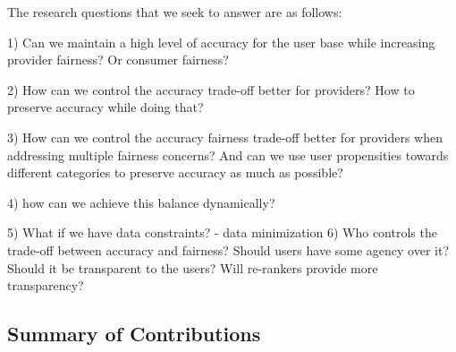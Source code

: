 The research questions that we seek to answer are as follows:

1) Can we maintain a high level of accuracy for the user base while increasing provider fairness? Or consumer fairness?

2) How can we control the accuracy trade-off better for providers? How to preserve accuracy while doing that? 

3) How can we control the accuracy fairness trade-off better for providers when addressing multiple fairness concerns? And can we use user propensities towards different categories to preserve accuracy as much as possible?

4) how can we achieve this balance dynamically?

5) What if we have data constraints? - data minimization
6) Who controls the trade-off between accuracy and fairness? Should users have some agency over it? Should it be transparent to the users? Will re-rankers provide more transparency?




\subsection{Summary of Contributions}


